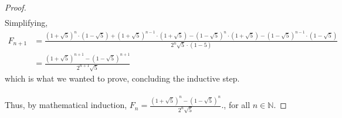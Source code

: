 \documentclass{article}
\begin{document}
\begin{itemize}
\begin{proof}
\begin{align*}
                        \end{align*}
                    Simplifying, 
                        \begin{align*}
                            F_{n + 1} &= \frac{(1 + \sqrt{5})^n \cdot (1 - \sqrt{5}) + (1 + \sqrt{5})^{n-1} \cdot (1 + \sqrt{5}) - (1 - \sqrt{5})^n \cdot (1 + \sqrt{5}) - (1 - \sqrt{5})^{n-1} \cdot (1 - \sqrt{5})}{2^n \sqrt{5} \cdot (1 - 5)} \\
                            &= \frac{(1 + \sqrt{5})^{n+1} - (1 - \sqrt{5})^{n+1}}{2^{n+1} \sqrt{5}}
                        \end{align*}
                        which is what we wanted to prove, concluding the inductive step.
                    \\\\ Thus, by mathematical induction, $F_n = \frac{ \left( 1+\sqrt{5} \right)^n - \left( 1-\sqrt{5} \right)^n }{ 2^n \sqrt{5} }.$, for all $n\in\mathbb{N}$.
                \end{proof}
    \end{itemize}
\end{document}
